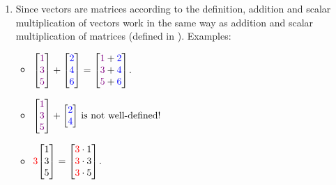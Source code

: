 \begin{enumerate}
\item Since vectors are matrices according to the definition, addition and
scalar multiplication of vectors work in the same way as addition and scalar
multiplication of matrices (defined in ).
Examples:
\begin{itemize}
\item 
\(\displaystyle 
\mqty[\vc{1}\\\vc{3}\\\vc{5}]
+\mqty[\blc{2}\\\blc{4}\\\blc{6}]
=\mqty[
\vc{1}+\blc{2}\\ \vc{3}+\blc{4}\\ \vc{5}+\blc{6}
]\).
\item 
\(\displaystyle 
\mqty[\vc{1}\\\vc{3}\\\vc{5}]
+\mqty[\blc{2}\\\blc{4}]
\text{ is not well-defined!}\)
\item \(\displaystyle 
\rc{3}\mqty[1\\3\\5]
=\mqty[\rc{3}\cdot 1\\ \rc{3}\cdot 3\\ \rc{3}\cdot 5]
\).
\end{itemize}


\end{enumerate}
